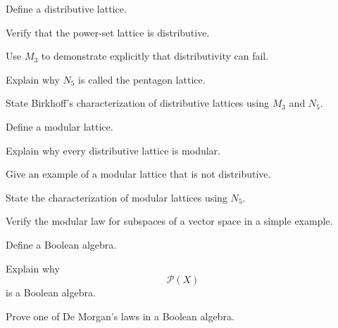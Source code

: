 \begin{exercise}[1]
Define a distributive lattice.
\end{exercise}

\begin{exercise}[2]
Verify that the power-set lattice is distributive.
\end{exercise}

\begin{exercise}[2]
Use \(M_3\) to demonstrate explicitly that distributivity can fail.
\end{exercise}

\begin{exercise}[2]
Explain why \(N_5\) is called the pentagon lattice.
\end{exercise}

\begin{exercise}[2]
State Birkhoff's characterization of distributive lattices using \(M_3\) and
\(N_5\).
\end{exercise}

\begin{exercise}[1]
Define a modular lattice.
\end{exercise}

\begin{exercise}[2]
Explain why every distributive lattice is modular.
\end{exercise}

\begin{exercise}[2]
Give an example of a modular lattice that is not distributive.
\end{exercise}

\begin{exercise}[2]
State the characterization of modular lattices using \(N_5\).
\end{exercise}

\begin{exercise}[2]
Verify the modular law for subspaces of a vector space in a simple example.
\end{exercise}

\begin{exercise}[1]
Define a Boolean algebra.
\end{exercise}

\begin{exercise}[2]
Explain why
\[ \mathcal P(X) \]
is a Boolean algebra.
\end{exercise}

\begin{exercise}[2]
Prove one of De Morgan's laws in a Boolean algebra.
\end{exercise}

